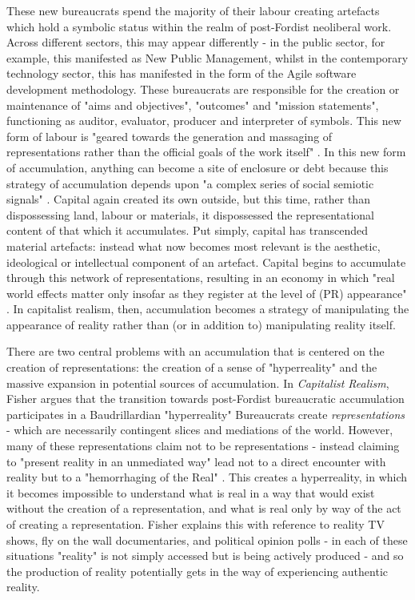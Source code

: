 These new bureaucrats spend the majority of their labour creating artefacts which hold a symbolic status within the realm of post-Fordist neoliberal work. Across different sectors, this may appear differently - in the public sector, for example, this manifested as New Public Management, whilst in the contemporary technology sector, this has manifested in the form of the Agile software development methodology. These bureaucrats are responsible for the creation or maintenance of "aims and objectives", "outcomes" and "mission statements", functioning as auditor, evaluator, producer and interpreter of symbols. This new form of labour is "geared towards the generation and massaging of representations rather than the official goals of the work itself" \citep[46]{fisher_capitalist_2009}. In this new form of accumulation, anything can become a site of enclosure or debt because this strategy of accumulation depends upon "a complex series of social semiotic signals" \citep[54]{fisher_capitalist_2009}. Capital again created its own outside, but this time, rather than dispossessing land, labour or materials, it dispossessed the representational content of that which it accumulates. Put simply, capital has transcended material artefacts: instead what now becomes most relevant is the aesthetic, ideological or intellectual component of an artefact. Capital begins to accumulate through this network of representations, resulting in an economy in which "real world effects matter only insofar as they register at the level of (PR) appearance" \citep[46]{fisher_capitalist_2009}. In capitalist realism, then, accumulation becomes a strategy of manipulating the appearance of reality rather than (or in addition to) manipulating reality itself.  

There are two central problems with an accumulation that is centered on the creation of representations: the creation of a sense of "hyperreality" and the massive expansion in potential sources of accumulation. In \emph{Capitalist Realism}, Fisher argues that the transition towards post-Fordist bureaucratic accumulation participates in a Baudrillardian "hyperreality" \citep[52]{fisher_capitalist_2009} Bureaucrats create \emph{representations} - which are necessarily contingent slices and mediations of the world. However, many of these representations claim not to be representations - instead claiming to "present reality in an unmediated way" lead not to a direct encounter with reality but to a "hemorrhaging of the Real" \citep[52]{fisher_capitalist_2009}. This creates a hyperreality, in which it becomes impossible to understand what is real in a way that would exist without the creation of a representation, and what is real only by way of the act of creating a representation. Fisher explains this with reference to reality TV shows, fly on the wall documentaries, and political opinion polls - in each of these situations "reality" is not simply accessed but is being actively produced - and so the production of  reality potentially gets in the way of experiencing authentic reality. 

